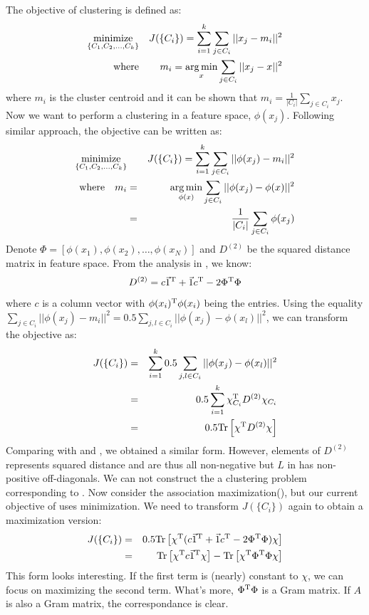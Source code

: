 The objective of clustering is defined as:
\begin{eqnarray}
	\operatorname*{minimize}_{\{C_1, C_2, \ldots, C_k\}} && 
	J(\{C_i\}) = \sum_{i=1}^{k}\sum_{j \in C_i}{||x_j-m_i||^2} \\
	\text{where} && m_i = \operatorname*{arg\,min}_x{ \sum_{j \in C_i}||x_j - x||^2 }
\end{eqnarray}
where $ m_i $ is the cluster centroid and it can be shown 
that $ m_i = \frac{1}{|C_i|} \sum_{j \in C_i}{x_j} $. Now we want to 
perform a clustering in a feature space, $ \phi(x_j) $. 
Following similar approach, the objective can be written as:
\begin{eqnarray}
	\operatorname*{minimize}_{\{C_1, C_2, \ldots, C_k\}} && 
	J(\{C_i\}) = \sum_{i=1}^{k}\sum_{j \in C_i}{||\phi(x_j)-m_i||^2} \\
	\text{where~~~}  m_i 
	&=& \operatorname*{arg\,min}_{\phi(x)}{ \sum_{j \in C_i}||\phi(x_j) - \phi(x) ||^2 } \nonumber \\
	&=& \frac{1}{|C_i|} \sum_{j \in C_i}{\phi(x_j)}
\end{eqnarray}
Denote $\Phi = [\phi(x_1), \phi(x_2), \ldots, \phi(x_N)]$
and $ D^{(2)} $ be the squared distance matrix in feature space. From the 
analysis in \rsec{\ref{sec:proximity}}, we know:
\begin{equation}
	D^{(2)} = c\vec{1}^\mathrm{T} + \vec{1}c^\mathrm{T} - 2 \Phi^\mathrm{T}\Phi
\end{equation}
where $c$ is a column vector with $\phi(x_i)^\mathrm{T}\phi(x_i)$ being the entries.
Using the equality $ \sum_{j \in C_i}{||\phi(x_j)-m_i||^2}
= 0.5 \sum_{j,l \in C_i}{||\phi(x_j)-\phi(x_l)||^2} $, 
we can transform the objective as:
\begin{eqnarray}
	J(\{C_i\}) &=& \sum_{i=1}^{k}0.5\sum_{j,l \in C_i}{||\phi(x_j)-\phi(x_l)||^2} \\
	&=& 0.5  \sum_{i=1}^{k} \chi_{C_i}^\mathrm{T} D^{(2)} \chi_{C_i} \\
	&=& 0.5 \mathrm{Tr}\left[ \chi^\mathrm{T} D^{(2)} \chi \right]
\end{eqnarray}
Comparing with \req{\ref{eq:cut_trmin}} and \req{\ref{eq:assoc_trmax}}, 
we obtained a similar form. However, elements of $ D^{(2)} $ represents 
squared distance and are thus all non-negative but
$ L $ in \req{\ref{eq:cut_trmin}} has non-positive off-diagonals. 
We can not construct the a clustering problem corresponding to \req{\ref{eq:cut_trmin}}. 
Now consider the association maximization(\req{\ref{eq:assoc_trmax}}), 
but our current objective of uses minimization. We need to transform 
$ J(\{C_i\}) $ again to obtain a maximization version:
\begin{eqnarray}
	J(\{C_i\}) &=& 0.5 \mathrm{Tr}\left[ \chi^\mathrm{T} 
	(c\vec{1}^\mathrm{T} + \vec{1}c^\mathrm{T} - 2 \Phi^\mathrm{T}\Phi)  \chi \right] \\
	&=& \mathrm{Tr}\left[ \chi^\mathrm{T}c\vec{1}^\mathrm{T}\chi \right]
	- \mathrm{Tr}\left[ \chi^\mathrm{T}\Phi^\mathrm{T}\Phi \chi\right]
\end{eqnarray}
This form looks interesting. If the first term is 
(nearly) constant to $ \chi $, we can focus 
on maximizing the second term. What's more, 
$ \Phi^\mathrm{T}\Phi $ is a Gram matrix. If $ A $ is also a 
Gram matrix, the correspondance is clear. 

